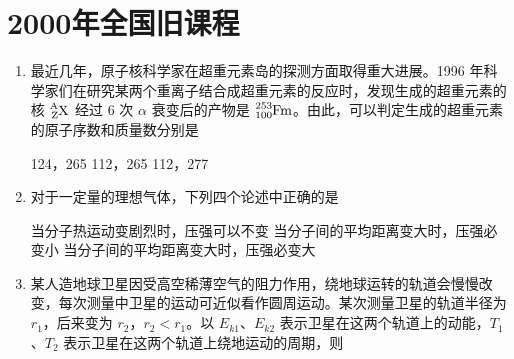 \documentclass[\gkver]{gaokaozhenti}
\begin{document}
\chapter{2000年全国旧课程}

\begin{enumerate}
\item
最近几年，原子核科学家在超重元素岛的探测方面取得重大进展。1996 年科学家们在研究某两个重离子结合成超重元素的反应时，发现生成的超重元素的核 $\ce{^{A}_{Z}X}$ 经过 6 次 $\alpha$ 衰变后的产物是 $\ce{^{253}_{100}Fm}$。由此，可以判定生成的超重元素的原子序数和质量数分别是 

{124，265}
{112，265}
{112，277}


\item
对于一定量的理想气体，下列四个论述中正确的是 

{当分子热运动变剧烈时，压强可以不变}
{当分子间的平均距离变大时，压强必变小}
{当分子间的平均距离变大时，压强必变大}


\item
某人造地球卫星因受高空稀薄空气的阻力作用，绕地球运转的轨道会慢慢改变，每次测量中卫星的运动可近似看作圆周运动。某次测量卫星的轨道半径为 $r_{1}$，后来变为 $r_{2}$，$r_{2} < r_{1}$。以 $E_{k1}$、$E_{k2}$ 表示卫星在这两个轨道上的动能，$T_{1}$、$T_{2}$ 表示卫星在这两个轨道上绕地运动的周期，则 


\end{enumerate}
\end{document}
